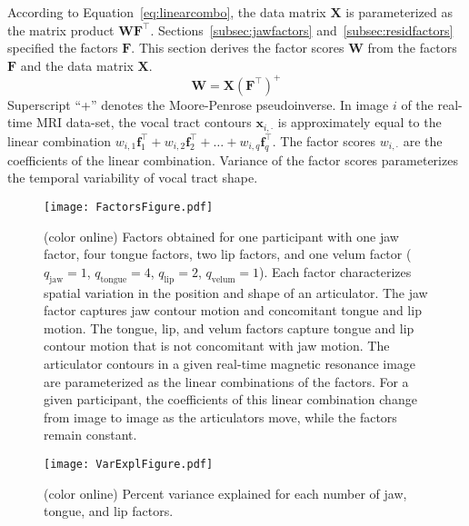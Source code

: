 \documentclass[reprint]{JASAnew}\usepackage[]{graphicx}\usepackage[]{color}
\begin{document}
According to Equation~\ref{eq:linearcombo}, the data matrix $\mathbf{X}$ is parameterized as the matrix product $\mathbf{W}\mathbf{F}^\intercal$. 
%
Sections~\ref{subsec:jawfactors} and~\ref{subsec:residfactors} specified the factors $\mathbf{F}$. 
%
This section derives the factor scores $\mathbf{W}$ from the factors $\mathbf{F}$ and the data matrix $\mathbf{X}$. 
%
\begin{equation}
\mathbf{W} 
 = \mathbf{X} \left( \mathbf{F}^\intercal \right) ^+
\end{equation}
%
Superscript ``+'' denotes the Moore-Penrose pseudoinverse.
%
In image $i$ of the real-time MRI data-set, the vocal tract contours $\mathbf{x}_{i,\cdot}$ is approximately equal to the linear combination $w_{i,1} \mathbf{f}_1^\intercal + w_{i,2} \mathbf{f}_2^\intercal + \ldots + w_{i,q} \mathbf{f}_q^\intercal$. The factor scores $w_{i,\cdot }$ are the coefficients of the linear combination. Variance of the factor scores parameterizes the temporal variability of vocal tract shape. 

\begin{figure}

\texttt{[image: FactorsFigure.pdf]}

\caption{(color online) Factors obtained for one participant with one jaw factor, four tongue factors, two lip factors, and one velum factor ($q_\text{jaw} = 1$, $q_\text{tongue} = 4$, $q_\text{lip} = 2$, $q_\text{velum} = 1$). 
Each factor characterizes spatial variation in the position and shape of an articulator. 
The jaw factor captures jaw contour motion and concomitant tongue and lip motion.
The tongue, lip, and velum factors capture tongue and lip contour motion that is not concomitant with jaw motion. 
The articulator contours in a given real-time magnetic resonance image are parameterized as the linear combinations of the factors. 
For a given participant, the coefficients of this linear combination change from image to image as the articulators move, while the factors remain constant.}
\label{fig:gfa}
\end{figure}

\begin{figure*}

\texttt{[image: VarExplFigure.pdf]}

\caption{(color online) Percent variance explained for each number of jaw, tongue, and lip factors.}
\label{fig:varexpl}
\end{figure*}
\end{document}
